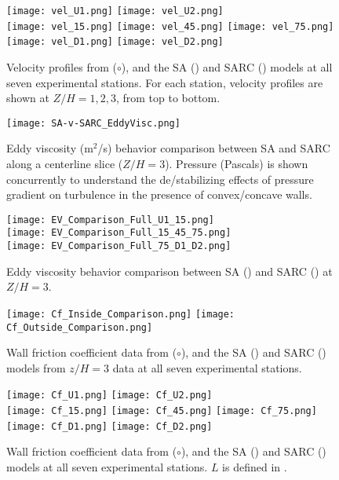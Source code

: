 \documentclass[11pt]{article}
\begin{document}
\begin{figure}[p]
\centering
\texttt{[image: vel\_U1.png]}
\texttt{[image: vel\_U2.png]}\\
\texttt{[image: vel\_15.png]}
\texttt{[image: vel\_45.png]}
\texttt{[image: vel\_75.png]}\\
\texttt{[image: vel\_D1.png]}
\texttt{[image: vel\_D2.png]}
\caption{Velocity profiles from \citet{kim1994} ($\circ$), and the SA ({\color{blue}\solidrule[6mm]}) and SARC ({\color{red}\dashrule}) models at all seven experimental stations. For each station, velocity profiles are shown at $Z/H = 1, 2, 3$, from top to bottom.}
\label{fig:velocity_slices}
\end{figure}

\begin{figure}[h!]
\centering
\texttt{[image: SA-v-SARC\_EddyVisc.png]}
\caption{Eddy viscosity (m$^2$/s) behavior comparison between SA and SARC along a centerline slice ($Z/H=3$). Pressure (Pascals) is shown concurrently to understand the de/stabilizing effects of pressure gradient on turbulence in the presence of convex/concave walls.}
\label{fig:ev_slices}
\end{figure}

\begin{figure}[h!]
\centering
\texttt{[image: EV\_Comparison\_Full\_U1\_15.png]}\\
\texttt{[image: EV\_Comparison\_Full\_15\_45\_75.png]}\\
\texttt{[image: EV\_Comparison\_Full\_75\_D1\_D2.png]}
\caption{Eddy viscosity behavior comparison between SA (\solidrule[6mm]) and SARC (\dashrule) at $Z/H=3$.}
\label{fig:ev_lines}
\end{figure}

\begin{figure}[h!]
\centering
\texttt{[image: Cf\_Inside\_Comparison.png]}
\texttt{[image: Cf\_Outside\_Comparison.png]}
\caption{Wall friction coefficient data from \citet{kim1994} ($\circ$), and the SA ({\color{blue}\solidrule[6mm]}) and SARC ({\color{red}\dashrule}) models from $z/H=3$ data at all seven experimental stations.}
\label{fig:Cf_Centerlines}
\end{figure}

\begin{figure}[h!]
\centering
\texttt{[image: Cf\_U1.png]}
\texttt{[image: Cf\_U2.png]}\\
\texttt{[image: Cf\_15.png]}
\texttt{[image: Cf\_45.png]}
\texttt{[image: Cf\_75.png]}\\
\texttt{[image: Cf\_D1.png]}
\texttt{[image: Cf\_D2.png]}
\caption{Wall friction coefficient data from \citet{kim1994} ($\circ$), and the SA ({\color{blue}\solidrule[6mm]}) and SARC ({\color{red}\dashrule}) models at all seven experimental stations. $L$ is defined in .}
\label{fig:Cf_slices}
\end{figure}
\end{document}
